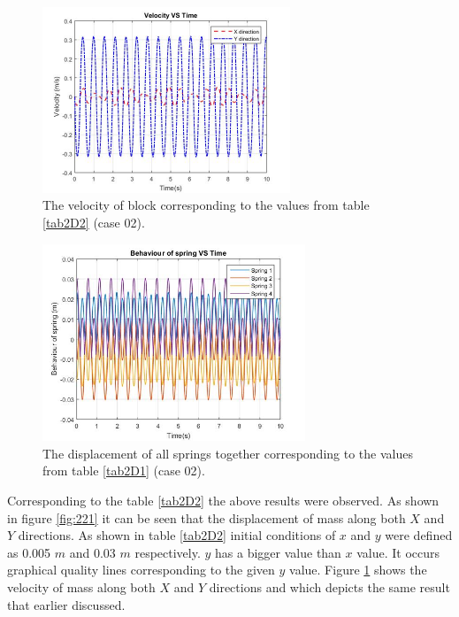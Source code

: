  \begin{figure}[hbt!]
	\centering
	\begin{framed}
	\includegraphics[width=0.66\textwidth]{Figures/2DV2.jpg}
	\end{framed}
	\caption{ The velocity of block corresponding to the values from table \ref{tab2D2} (case 02). }
	\label{fig:222}
\end{figure}

\newpage


 \begin{figure}[hbt!]
	\centering
	\begin{framed}
	\includegraphics[width=0.7\textwidth]{Figures/2DA2.jpg}
		\end{framed}
	\caption{ The displacement of all springs together corresponding to the values from table \ref{tab2D1} (case 02). }
	\label{fig:223}
\end{figure}

Corresponding to the table \ref{tab2D2} the above results were observed. As shown in figure \ref{fig:221} it can be seen that the displacement of  mass along both $X$ and $Y$ directions. As shown in table  \ref{tab2D2} initial conditions of $x$ and $y$ were defined as 0.005 $m$ and 0.03 $m$ respectively. $y$ has a bigger value than $x$ value. It occurs graphical quality lines corresponding to the given $y$ value. Figure \ref{fig:222} shows the velocity of  mass along both $X$ and $Y$ directions and which depicts the same result that earlier discussed. 

